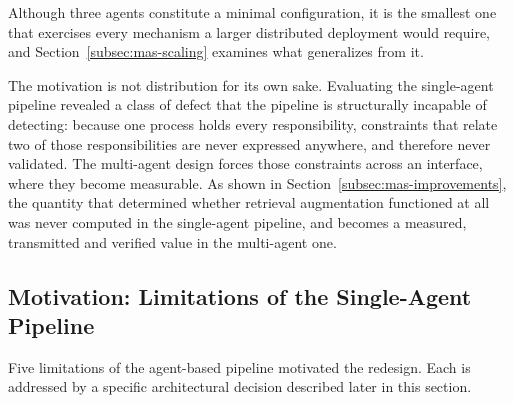 Although three agents constitute a minimal configuration, it is the smallest one that
exercises every mechanism a larger distributed deployment would require, and
Section~\ref{subsec:mas-scaling} examines what generalizes from it.

The motivation is not distribution for its own sake. Evaluating the single-agent pipeline
revealed a class of defect that the pipeline is structurally incapable of detecting:
because one process holds every responsibility, constraints that relate two of those
responsibilities are never expressed anywhere, and therefore never validated. The
multi-agent design forces those constraints across an interface, where they become
measurable. As shown in Section~\ref{subsec:mas-improvements}, the quantity that determined
whether retrieval augmentation functioned at all was never computed in the single-agent
pipeline, and becomes a measured, transmitted and verified value in the multi-agent one.

\subsection{Motivation: Limitations of the Single-Agent Pipeline}
\label{subsec:mas-motivation}

Five limitations of the agent-based pipeline motivated the redesign. Each is addressed by a
specific architectural decision described later in this section.

